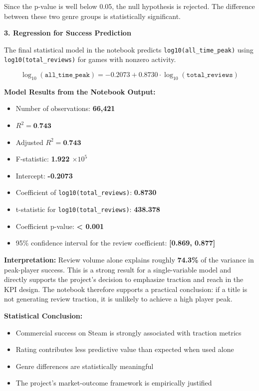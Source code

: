 \documentclass[12pt,a4paper]{report}
\begin{document}
Since the p-value is well below 0.05, the null hypothesis is rejected. The difference between these two genre groups is statistically significant.

\textbf{3. Regression for Success Prediction}

The final statistical model in the notebook predicts \texttt{log10(all\_time\_peak)} using \texttt{log10(total\_reviews)} for games with nonzero activity.

\[
\log_{10}(\texttt{all\_time\_peak}) = -0.2073 + 0.8730 \cdot \log_{10}(\texttt{total\_reviews})
\]

\textbf{Model Results from the Notebook Output:}
\begin{itemize}
\item Number of observations: \textbf{66,421}
\item $R^2 = \textbf{0.743}$
\item Adjusted $R^2 = \textbf{0.743}$
\item F-statistic: \textbf{1.922 $\times 10^5$}
\item Intercept: \textbf{-0.2073}
\item Coefficient of \texttt{log10(total\_reviews)}: \textbf{0.8730}
\item t-statistic for \texttt{log10(total\_reviews)}: \textbf{438.378}
\item Coefficient p-value: \textbf{< 0.001}
\item 95\% confidence interval for the review coefficient: \textbf{[0.869, 0.877]}
\end{itemize}

\textbf{Interpretation:} Review volume alone explains roughly \textbf{74.3\%} of the variance in peak-player success. This is a strong result for a single-variable model and directly supports the project's decision to emphasize traction and reach in the KPI design. The notebook therefore supports a practical conclusion: if a title is not generating review traction, it is unlikely to achieve a high player peak.

\textbf{Statistical Conclusion:}
\begin{itemize}
\item Commercial success on Steam is strongly associated with traction metrics
\item Rating contributes less predictive value than expected when used alone
\item Genre differences are statistically meaningful
\item The project's market-outcome framework is empirically justified
\end{itemize}
\end{document}
